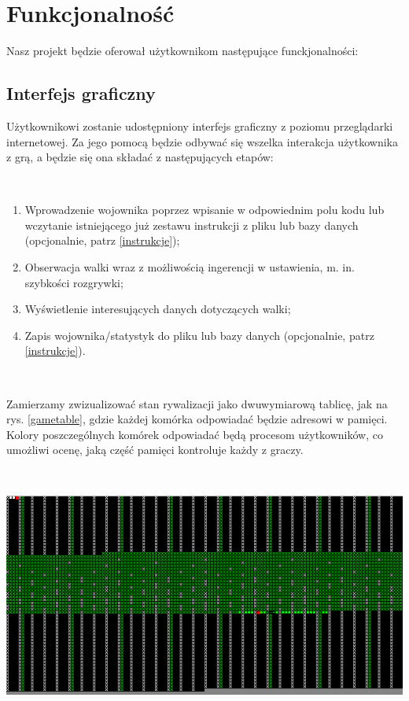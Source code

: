 {\let\clearpage\relax \chapter{Funkcjonalność}}
Nasz projekt będzie oferował użytkownikom następujące funckjonalności:

\section{Interfejs graficzny}

Użytkownikowi zostanie udostępniony interfejs graficzny z poziomu przeglądarki internetowej. Za jego pomocą będzie odbywać się wszelka interakcja użytkownika z grą, a będzie się ona składać z następujących etapów:

\
\begin{enumerate}
	\item Wprowadzenie wojownika poprzez wpisanie w odpowiednim polu kodu lub wczytanie istniejącego już zestawu instrukcji z pliku lub bazy danych (opcjonalnie, patrz \ref{instrukcje});

	\item Obserwacja walki wraz z możliwością ingerencji w ustawienia, m. in. szybkości rozgrywki;

	\item Wyświetlenie interesujących danych dotyczących walki;

	\item Zapis wojownika/statystyk do pliku lub bazy danych (opcjonalnie, patrz \ref{instrukcje}).
	
\end{enumerate}

\

Zamierzamy zwizualizować stan rywalizacji jako dwuwymiarową tablicę, jak na rys. \ref{gametable}, gdzie każdej komórka odpowiadać będzie adresowi w pamięci. Kolory poszczególnych komórek odpowiadać będą procesom użytkowników, co umożliwi ocenę, jaką część pamięci kontroluje każdy z graczy.

\

\includegraphics[width=\linewidth]{utils/pic1.png}
\label{gametable}

